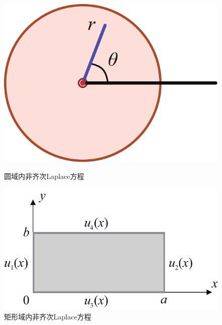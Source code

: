 \begin{figure}[!htb]
	\centering
	\begin{minipage}{0.45\linewidth}
		\centering
		\includegraphics[width=0.5\linewidth]{pic/圆域.pdf}
		\caption{圆域内非齐次Laplace方程}
		\label{圆域}
	\end{minipage}
	\begin{minipage}{0.45\linewidth}
		\centering
		\includegraphics[width=0.743\linewidth]{pic/矩形.pdf}
		\vspace*{-1em}
		\caption{矩形域内非齐次Laplace方程}
		\label{矩形}
	\end{minipage}
\end{figure}
\vspace*{-0.5em}


